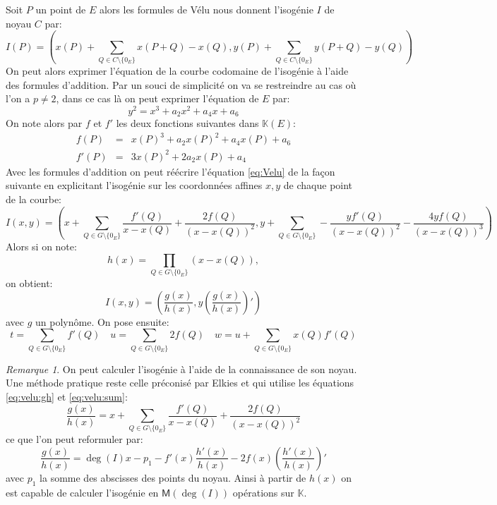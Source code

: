 \documentclass[10pt,a4paper]{book}
\theoremstyle{plain}
\theoremstyle{definition}
\theoremstyle{definition}
\theoremstyle{definition}
\theoremstyle{definition}
\theoremstyle{remark}
\newtheorem{rem}[thm]{Remarque}
\theoremstyle{remark}
\theoremstyle{definition}
\begin{document}
Soit $P$ un point de $E$ alors les formules de Vélu nous donnent l'isogénie $I$ de noyau $C$ par: 
\begin{equation}
\label{eq:Velu}
I(P)= \left( x(P)+\sum_{Q \in C \setminus \{0_E\}} x(P+Q)-x(Q),y(P)+\sum_{Q \in C \setminus \{0_E\}} y(P+Q)-y(Q) \right)
\end{equation} 
On peut alors exprimer l'équation de la courbe codomaine de l'isogénie à l'aide des formules d'addition. Par un souci de simplicité on va se restreindre au cas où l'on a $p \neq 2$, dans ce cas là on peut exprimer l'équation de $E$ par:
\begin{equation*}
y^2=x^3+a_2 x^2 + a_4 x + a_6
\end{equation*}
On note alors par $f$ et $f'$ les deux fonctions suivantes dans $\mathbb{K}(E)$:
\begin{align*}
f(P)&=& x(P)^3+a_2x(P)^2+a_4x(P)+a_6 \\
f'(P)&=& 3x(P)^2+2a_2x(P)+a_4
\end{align*}
Avec les formules d'addition on peut réécrire l'équation \eqref{eq:Velu} de la façon suivante en explicitant l'isogénie sur les coordonnées affines $x,y$ de chaque point de la courbe:
\begin{equation} \label{eq:velu:sum}
I(x,y)=\left( x + \sum_{Q \in G \setminus \{0_E\}} \frac{f'(Q)}{x-x(Q)}+\frac{2f(Q)}{(x-x(Q))^2} , y + \sum_{Q \in G \setminus \{0_E\}} -\frac{yf'(Q)}{(x-x(Q))^2}-\frac{4yf(Q)}{(x-x(Q))^3}  \right)
\end{equation}
Alors si on note: 
\begin{equation*}
h(x)=\prod_{Q \in G \setminus \{0_E\}}(x-x(Q)),
\end{equation*}
on obtient:
\begin{equation} 
\label{eq:velu:gh}
I(x,y)=\left(\frac{g(x)}{h(x)},y\left( \frac{g(x)}{h(x)} \right)'\right)
\end{equation}
avec $g$ un polynôme. On pose ensuite:
\begin{equation*}
t= \sum_{Q \in G \setminus \{0_E\}} f'(Q) \quad u=\sum_{Q \in G \setminus \{0_E\}} 2f(Q) \quad w=u+\sum_{Q \in G \setminus \{0_E\}}x(Q)f'(Q) 
\end{equation*}

\begin{rem}
On peut calculer l'isogénie à l'aide de la connaissance de son noyau. Une méthode pratique reste celle préconisé par Elkies \cite{elkies1998} et \cite[Section 2.4]{Kohel96}  qui utilise les équations \eqref{eq:velu:gh} et \eqref{eq:velu:sum}:
\begin{equation*}
\frac{g(x)}{h(x)}= x + \sum_{Q \in G \setminus \{0_E\}} \frac{f'(Q)}{x-x(Q)}+\frac{2f(Q)}{(x-x(Q))^2}
\end{equation*}
ce que l'on peut reformuler par:
\begin{equation}
\frac{g(x)}{h(x)}= \deg(I) x -p_1 - f'(x) \frac{h'(x)}{h(x)} -2f(x)  \left(\frac{h'(x)}{h(x)}\right)'
\end{equation}
avec $p_1$ la somme des abscisses des points du noyau. Ainsi à partir de $h(x)$ on est capable de calculer l'isogénie en $\mathsf{M}(\deg(I))$ opérations sur $\mathbb{K}$.
\end{rem}
\end{document}
